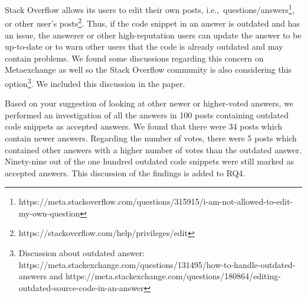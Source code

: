 \documentclass[a4paper,twoside,10pt]{reviewresponse}
\begin{document}

Stack Overflow allows its users to edit their own posts,
i.e.,~questions/answers\footnote{https://meta.stackoverflow.com/questions/315915/i-am-not-allowed-to-edit-my-own-question}, or other user's posts\footnote{https://stackoverflow.com/help/privileges/edit}. Thus, if the code snippet in an answer is outdated and has an issue, the answerer or other high-reputation users can update the answer to be up-to-date or to warn other users that the code is already outdated and may contain problems. We found some discussions regarding this concern on Metaexchange as well so the Stack Overflow community is also considering this option\footnote{Discussion about outdated answer: https://meta.stackexchange.com/questions/131495/how-to-handle-outdated-answers and https://meta.stackexchange.com/questions/180864/editing-outdated-source-code-in-an-answer}. We included this discussion in the paper.

Based on your suggestion of looking at other newer or higher-voted answers, we
performed an investigation of all the answers in 100 posts containing outdated
code snippets as accepted answers. We found that there were 34 posts which
contain newer answers. Regarding the number of votes, there were 5 posts which
contained other answers with a higher number of votes than the outdated answer.
Ninety-nine out of the one hundred outdated code snippets were still marked as accepted
answers. This discussion of the findings is added to RQ4.
		
\end{document}
